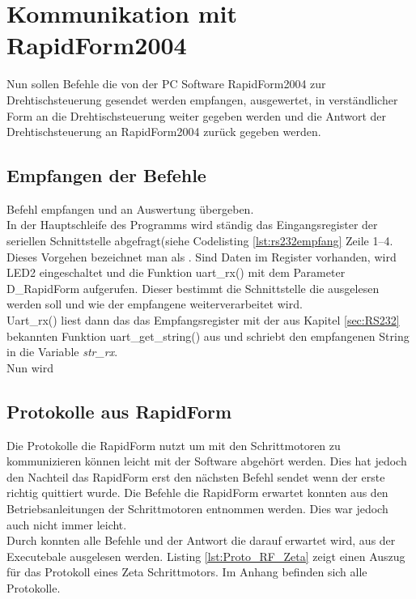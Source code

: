 \section{Kommunikation mit RapidForm2004}

Nun sollen Befehle die von der PC Software RapidForm2004 zur Drehtischsteuerung gesendet werden empfangen, ausgewertet, in verständlicher Form an die Drehtischsteuerung weiter gegeben werden und die Antwort der Drehtischsteuerung an RapidForm2004 zurück gegeben werden.
\subsection{Empfangen der Befehle}
Befehl empfangen und an Auswertung übergeben.\\
In der Hauptschleife des Programms wird ständig das Eingangsregister der seriellen Schnittstelle abgefragt(siehe Codelisting \ref{lst:rs232empfang} Zeile 1--4. Dieses Vorgehen bezeichnet man als .
Sind Daten im Register vorhanden, wird LED2 eingeschaltet und die Funktion uart\_rx() mit dem Parameter D\_RapidForm aufgerufen. Dieser bestimmt die Schnittstelle die ausgelesen werden soll und wie der empfangene  weiterverarbeitet wird. \\
Uart\_rx() liest dann das das Empfangsregister mit der aus Kapitel \ref{sec:RS232} bekannten Funktion uart\_get\_string() aus und schriebt den empfangenen String in die Variable \emph{str\_rx}.\\
Nun wird

\lstset{language=Java, basicstyle=\footnotesize, showstringspaces=false, tabsize=8}






\subsection{Protokolle aus RapidForm}
Die Protokolle die RapidForm nutzt um mit den Schrittmotoren zu kommunizieren können leicht mit der Software  abgehört werden. Dies hat jedoch den Nachteil das RapidForm erst den nächsten Befehl sendet wenn der erste richtig quittiert wurde. Die Befehle die RapidForm erwartet konnten aus den Betriebsanleitungen der Schrittmotoren entnommen werden. Dies war jedoch auch nicht immer leicht.\\
Durch  konnten alle Befehle und der Antwort die darauf erwartet wird, aus der Executebale ausgelesen werden. Listing \ref{lst:Proto_RF_Zeta} zeigt einen Auszug für das Protokoll eines Zeta Schrittmotors. Im Anhang befinden sich alle Protokolle.
\lstset{language=C, basicstyle=\footnotesize, showstringspaces=false, tabsize=8}

